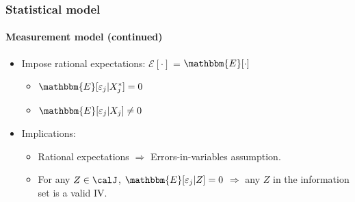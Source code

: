 
\begin{frame}
\frametitle{Statistical model} \framesubtitle{Measurement model (continued)}

\begin{itemize}
\item Impose rational expectations: $\mathcal{E}[\cdot]$ = $%
\mathbbm{E}[\cdot]$ 

\begin{itemize}
\item $\mathbbm{E}[\varepsilon_{j}|X^{*}_{j}]=0$ 

\item $\mathbbm{E}[\varepsilon_{j}|X_{j}]\neq0$ 
\end{itemize}

\item Implications: 

\begin{itemize}
\item Rational expectations $\Longrightarrow$ Errors-in-variables
assumption. 

\item For any $Z\in\calJ$, $\mathbbm{E}[\varepsilon_{j}|Z]=0$ $%
\Longrightarrow$ any $Z$ in the information set is a valid IV. 
\end{itemize}
\end{itemize}
\end{frame}


